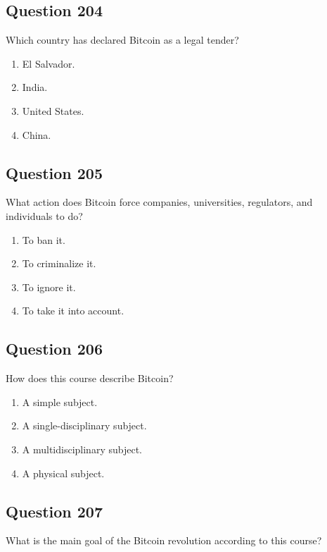\documentclass[12pt,a4paper]{article}
\begin{document}
\bigskip


\subsection*{Question 204}
Which country has declared Bitcoin as a legal tender?

\begin{enumerate}[label=\Alph*., leftmargin=*]
\item El Salvador.
\item India.
\item United States.
\item China.
\end{enumerate}

\bigskip


\subsection*{Question 205}
What action does Bitcoin force companies, universities, regulators, and individuals to do?

\begin{enumerate}[label=\Alph*., leftmargin=*]
\item To ban it.
\item To criminalize it.
\item To ignore it.
\item To take it into account.
\end{enumerate}

\bigskip


\subsection*{Question 206}
How does this course describe Bitcoin?

\begin{enumerate}[label=\Alph*., leftmargin=*]
\item A simple subject.
\item A single-disciplinary subject.
\item A multidisciplinary subject.
\item A physical subject.
\end{enumerate}

\bigskip


\subsection*{Question 207}
What is the main goal of the Bitcoin revolution according to this course?
\end{document}
